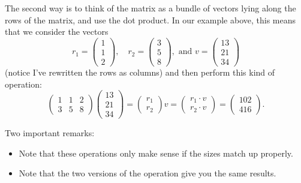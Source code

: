 \documentclass[10pt,]{book}
\theoremstyle{plain}
\theoremstyle{definition}
\numberwithin{equation}{section}
\begin{document}
          The second way is to think of the matrix as a bundle of vectors lying
          along the rows of the matrix, and use the dot product. In our example
          above, this means that we consider the vectors\[
            r_1 = \begin{pmatrix} 1 \\ 1 \\ 2 \end{pmatrix}, \quad
            r_2 = \begin{pmatrix} 3 \\ 5 \\ 8 \end{pmatrix}, \text{ and }
            v = \begin{pmatrix} 13 \\ 21 \\ 34 \end{pmatrix}
          \]
          (notice I've rewritten the rows as columns) and then perform this
          kind of operation:\[
            \begin{pmatrix} 1 & 1 & 2 \\ 3 & 5 & 8 \end{pmatrix}
            \begin{pmatrix} 13 \\ 21 \\ 34 \end{pmatrix} = \begin{pmatrix} r_1
            \\ r_2 \end{pmatrix} v =  \begin{pmatrix} r_1 \cdot v \\ r_2 \cdot
            v \end{pmatrix} =
            \begin{pmatrix} 102 \\ 416 \end{pmatrix} .
          \]
\par

      Two important remarks:
      \begin{itemize}
\item{}
          Note that these operations only make sense if the sizes match up properly.
        \item{}
          Note that the two versions of the operation give you the same results.
        \end{itemize}

\typeout{************************************************}
\typeout{************************************************}
\end{document}
